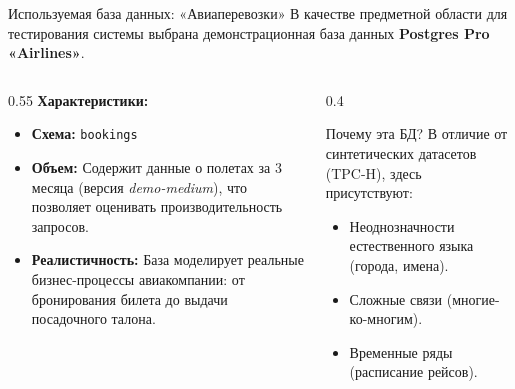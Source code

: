 \documentclass[10pt, aspectratio=169, unicode]{beamer}
\begin{document}
\begin{frame}{Используемая база данных: «Авиаперевозки»}
    В качестве предметной области для тестирования системы выбрана демонстрационная база данных \textbf{Postgres Pro «Airlines»}.
    
    \begin{columns}[T]
        \begin{column}{0.55\textwidth}
             \textbf{Характеристики:}
             \begin{itemize}
                 \item \textbf{Схема:} \texttt{bookings}
                 \item \textbf{Объем:} Содержит данные о полетах за 3 месяца (версия \textit{demo-medium}), что позволяет оценивать производительность запросов.
                 \item \textbf{Реалистичность:} База моделирует реальные бизнес-процессы авиакомпании: от бронирования билета до выдачи посадочного талона.
             \end{itemize}
        \end{column}
        
        \begin{column}{0.4\textwidth}
             \begin{block}{Почему эта БД?}
                 В отличие от синтетических датасетов (TPC-H), здесь присутствуют:
                 \begin{itemize}
                     \item Неоднозначности естественного языка (города, имена).
                     \item Сложные связи (многие-ко-многим).
                     \item Временные ряды (расписание рейсов).
                 \end{itemize}
             \end{block}
        \end{column}
    \end{columns}
\end{frame}
\end{document}
